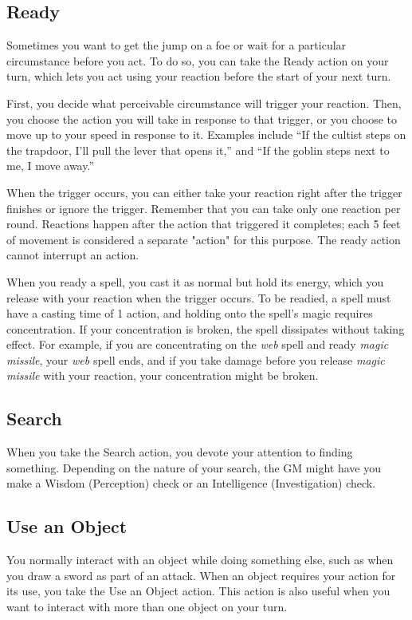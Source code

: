 \subsection{Ready}

Sometimes you want to get the jump on a foe or wait for a particular circumstance before you act. To do so, you can take the Ready action on your turn, which lets you act using your reaction before the start of your next turn.

First, you decide what perceivable circumstance will trigger your reaction. Then, you choose the action you will take in response to that trigger, or you choose to move up to your speed in response to it. Examples include “If the cultist steps on the trapdoor, I'll pull the lever that opens it,” and “If the goblin steps next to me, I move away.”

When the trigger occurs, you can either take your reaction right after the trigger finishes or ignore the trigger. Remember that you can take only one reaction per round. Reactions happen after the action that triggered it completes; each 5 feet of movement is considered a separate "action" for this purpose. The ready action cannot interrupt an action.

When you ready a spell, you cast it as normal but hold its energy, which you release with your reaction when the trigger occurs. To be readied, a spell must have a casting time of 1 action, and holding onto the spell's magic requires concentration. If your concentration is broken, the spell dissipates without taking effect. For example, if you are concentrating on the \textit{web} spell and ready \textit{magic missile}, your \textit{web} spell ends, and if you take damage before you release \textit{magic missile} with your reaction, your concentration might be broken.

\subsection{Search}

When you take the Search action, you devote your attention to finding something. Depending on the nature of your search, the GM might have you make a Wisdom (Perception) check or an Intelligence (Investigation) check.

\subsection{Use an Object}

You normally interact with an object while doing something else, such as when you draw a sword as part of an attack. When an object requires your action for its use, you take the Use an Object action. This action is also useful when you want to interact with more than one object on your turn.

